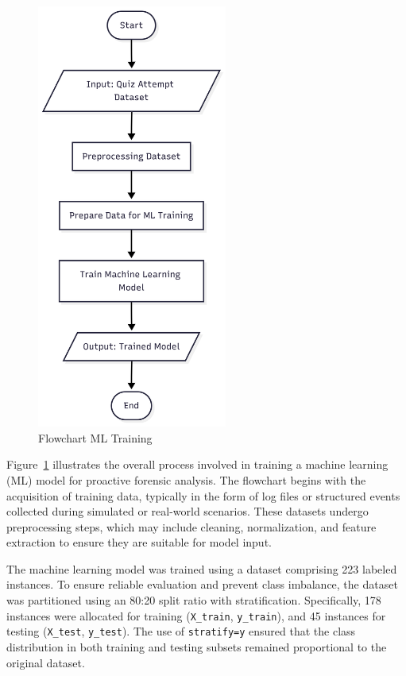 \begin{figure}[H] 
	\centering
	\includegraphics[height=14cm]{figure/flow-ml-model.png}
	\caption{Flowchart ML Training }
	\label{fig:flow-ml-training}
\end{figure}
Figure~\ref{fig:flow-ml-training} illustrates the overall process involved in training a machine learning (ML) model for proactive forensic analysis. The flowchart begins with the acquisition of training data, typically in the form of log files or structured events collected during simulated or real-world scenarios. These datasets undergo preprocessing steps, which may include cleaning, normalization, and feature extraction to ensure they are suitable for model input.

The machine learning model was trained using a dataset comprising 223 labeled instances. To ensure reliable evaluation and prevent class imbalance, the dataset was partitioned using an 80:20 split ratio with stratification. Specifically, 178 instances were allocated for training (\texttt{X\_train}, \texttt{y\_train}), and 45 instances for testing (\texttt{X\_test}, \texttt{y\_test}). The use of \texttt{stratify=y} ensured that the class distribution in both training and testing subsets remained proportional to the original dataset.



